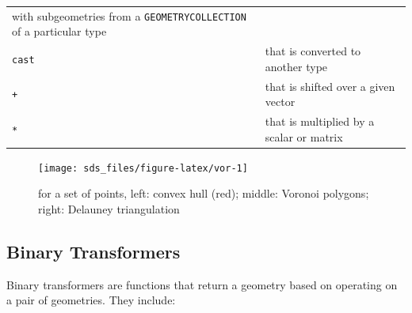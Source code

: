 \documentclass[]{book}
\begin{document}
\begin{longtable}[]{@{}ll@{}}
\begin{minipage}[t]{0.71\columnwidth}
with subgeometries from a \texttt{GEOMETRYCOLLECTION} of a particular type\strut
\end{minipage}\tabularnewline
\begin{minipage}[t]{0.23\columnwidth}\raggedright
\texttt{cast}\strut
\end{minipage} & \begin{minipage}[t]{0.71\columnwidth}\raggedright
that is converted to another type\strut
\end{minipage}\tabularnewline
\begin{minipage}[t]{0.23\columnwidth}\raggedright
\texttt{+}\strut
\end{minipage} & \begin{minipage}[t]{0.71\columnwidth}\raggedright
that is shifted over a given vector\strut
\end{minipage}\tabularnewline
\begin{minipage}[t]{0.23\columnwidth}\raggedright
\texttt{*}\strut
\end{minipage} & \begin{minipage}[t]{0.71\columnwidth}\raggedright
that is multiplied by a scalar or matrix\strut
\end{minipage}\tabularnewline
\bottomrule
\end{longtable}

\begin{figure}

{\centering \texttt{[image: sds\_files/figure-latex/vor-1]} 

}

\caption{for a set of points, left: convex hull (red); middle: Voronoi polygons; right: Delauney triangulation}\label{fig:vor}
\end{figure}

\hypertarget{bintrans}{%
\subsection{Binary Transformers}\label{bintrans}}

Binary transformers are functions that return a geometry based on
operating on a pair of geometries. They include:
\end{document}
